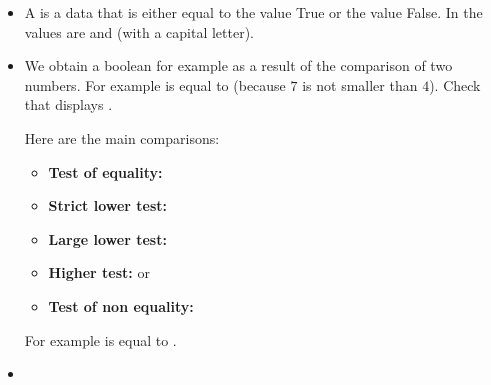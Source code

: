 \documentclass[11pt,class=report,crop=false]{standalone}
\begin{document}

\begin{cours}[Booleans]
\sauteligne
\begin{itemize}
  \item A  is a data that is either equal to the value \og{}True\fg{} or the value \og{}False\fg{}. In \Python{} the values are  and  (with a capital letter).
  
  \item We obtain a boolean for example as a result of the comparison of two numbers.
  For example  is equal to  (because $7$ is not smaller than $4$). 
  Check that  displays .
  
  Here are the main comparisons:
  \begin{itemize}
    \item \textbf{Test of equality:}\quad {}\index{\ci{==}}
    	\item \textbf{Strict lower test:}\quad {}
    	\item \textbf{Large lower test:}\quad {}\index{\ci{<=}}
    	\item \textbf{Higher test:}\quad {} \quad or \quad {}\index{\ci{>=}}
    	\item \textbf{Test of non equality:}\quad {}
  \end{itemize}
   
   For example  is equal to .
   

   
   
   \item ~
   

\end{itemize}
\end{cours}
\end{document}
